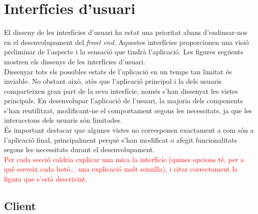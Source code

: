 \documentclass[a4paper,12pt,twoside]{ThesisStyle}
\newcommand{\pau}[1]{\textcolor{red}{#1}}
\begin{document}
\section{Interfícies d'usuari}
\label{ sec: Interfícies d'usuari }


El disseny de les interfícies d'usuari ha estat una prioritat abans d'endinsar-nos en el desenvolupament del \textit{front end}. Aquestes interfícies proporcionen una visió preliminar de l'aspecte i la sensació que tindrà l'aplicació. Les figures següents mostren els dissenys de les interfícies d'usuari. \\

Dissenyar tots els possibles estats de l'aplicació en un temps tan limitat és inviable. No obstant això, atès que l'aplicació principal i la dels usuaris comparteixen gran part de la seva interfície, només s'han dissenyat les vistes principals. En desenvolupar l'aplicació de l'usuari, la majoria dels components s'han reutilitzat, modificant-ne el comportament segons les necessitats, ja que les interaccions dels usuaris són limitades.\\

És important destacar que algunes vistes no corresponen exactament a com són a l'aplicació final, principalment perquè s'han modificat o afegit funcionalitats segons les necessitats durant el desenvolupament.\\

\pau{Per cada secció caldria explicar una mica la interfície (quines opcions té, per a què serveix cada botó... una explicació molt senzilla), i citar correctament la figura que s'està descrivint.}


\subsection{Client}
\label{subsec: Client}
\end{document}

